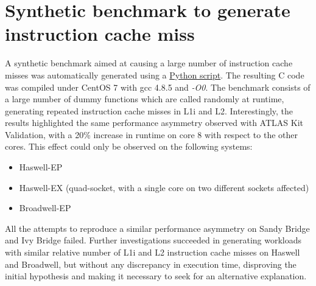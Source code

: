 \documentclass[a4paper]{jpconf}
\begin{document}
\section{Synthetic benchmark to generate instruction cache miss}
A synthetic benchmark aimed at causing a large number of instruction cache 
misses was automatically generated using a \href{https://gitlab.cern.ch/snippets/216}{Python script}. The resulting C code was compiled
under CentOS 7 with gcc 4.8.5 and \textit{-O0}. The benchmark consists of a large
number of dummy functions which are called randomly at runtime, generating
repeated instruction cache misses in L1i and L2. Interestingly, the results
highlighted the same performance asymmetry observed with ATLAS Kit Validation,
with a 20\% increase in runtime on core 8 with respect to the other cores.
This effect could only be observed on the following systems:
\begin{itemize}
    \item Haswell-EP
    \item Haswell-EX (quad-socket, with a single core on two different sockets affected)
    \item Broadwell-EP
\end{itemize}
All the attempts to reproduce a similar performance asymmetry on Sandy Bridge
and Ivy Bridge failed.
Further investigations succeeded in generating
workloads with similar relative number of L1i and L2 instruction cache misses
on Haswell and Broadwell, but without any discrepancy in execution time, 
disproving the initial hypothesis and making it necessary to seek for an 
alternative explanation.
\end{document}
